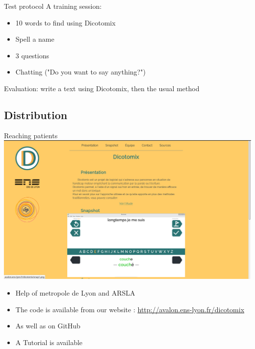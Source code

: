 \documentclass[graphics]{beamer}
\begin{document}
\begin{frame}{Test protocol}
	A training session:
	\begin{itemize}
		\item 10 words to find using Dicotomix
		\item Spell a name
		\item 3 questions
		\item Chatting ("Do you want to say anything?")
	\end{itemize}
	Evaluation: write a text using Dicotomix, then the usual method
\end{frame}

\subsection{Distribution}
\begin{frame}{Reaching patients}
	\hspace{7cm}
	\includegraphics[scale=0.075]{website}\\
	\begin{itemize}
		\item Help of metropole de Lyon and ARSLA
		\pause
		\item The code is available from our website : \hyperref[http://avalon.ens-lyon.fr/dicotomix]{http://avalon.ens-lyon.fr/dicotomix}
		\pause
		\item As well as on GitHub
		\pause
		\item A Tutorial is available
	\end{itemize}
	\hspace{10cm}

\end{frame}
\end{document}
